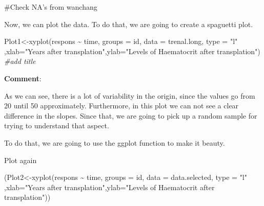 \documentclass[
]{article}
\newenvironment{Shaded}{\begin{snugshade}}{\end{snugshade}}
\newcommand{\AttributeTok}[1]{\textcolor[rgb]{0.77,0.63,0.00}{#1}}
\newcommand{\CommentTok}[1]{\textcolor[rgb]{0.56,0.35,0.01}{\textit{#1}}}
\newcommand{\DecValTok}[1]{\textcolor[rgb]{0.00,0.00,0.81}{#1}}
\newcommand{\FunctionTok}[1]{\textcolor[rgb]{0.00,0.00,0.00}{#1}}
\newcommand{\NormalTok}[1]{#1}
\newcommand{\OtherTok}[1]{\textcolor[rgb]{0.56,0.35,0.01}{#1}}
\newcommand{\SpecialCharTok}[1]{\textcolor[rgb]{0.00,0.00,0.00}{#1}}
\newcommand{\StringTok}[1]{\textcolor[rgb]{0.31,0.60,0.02}{#1}}
\begin{document}
\#Check NA's from wanchang

Now, we can plot the data. To do that, we are going to create a
spaguetti plot.

\begin{Shaded}
\begin{Highlighting}[]
\NormalTok{Plot1}\OtherTok{\textless{}{-}}\FunctionTok{xyplot}\NormalTok{(respons }\SpecialCharTok{\textasciitilde{}}\NormalTok{ time, }\AttributeTok{groups =}\NormalTok{ id,}
              \AttributeTok{data =}\NormalTok{ trenal.long,}
              \AttributeTok{type =} \StringTok{"l"}\NormalTok{ ,}\AttributeTok{xlab=}\StringTok{"Years after transplation"}\NormalTok{,}\AttributeTok{ylab=}\StringTok{"Levels of Haematocrit after transplation"}\NormalTok{)}
\CommentTok{\#add title}
\end{Highlighting}
\end{Shaded}

\textbf{Comment}:

As we can see, there is a lot of variability in the origin, since the
values go from 20 until 50 approximately. Furthermore, in this plot we
can not see a clear difference in the slopes. Since that, we are going
to pick up a random sample for trying to understand that aspect.

To do that, we are going to use the ggplot function to make it beauty.

\begin{Shaded}
\end{Shaded}

Plot again

\begin{Shaded}
\begin{Highlighting}[]
\NormalTok{(Plot2}\OtherTok{\textless{}{-}}\FunctionTok{xyplot}\NormalTok{(respons }\SpecialCharTok{\textasciitilde{}}\NormalTok{ time, }\AttributeTok{groups =}\NormalTok{ id,}
              \AttributeTok{data =}\NormalTok{ data.selected,}
              \AttributeTok{type =} \StringTok{"l"}\NormalTok{ ,}\AttributeTok{xlab=}\StringTok{"Years after transplation"}\NormalTok{,}\AttributeTok{ylab=}\StringTok{"Levels of Haematocrit after transplation"}\NormalTok{))}
\end{Highlighting}
\end{Shaded}
\end{document}
